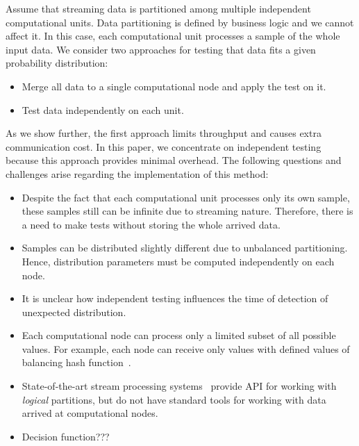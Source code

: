 \label {fs-short-model}

Assume that streaming data is partitioned among multiple independent computational units. Data partitioning is defined by business logic and we cannot affect it. In this case, each computational unit processes a sample of the whole input data. We consider two approaches for testing that data fits a given probability distribution:

\begin{itemize}
    \item Merge all data to a single computational node and apply the test on it.
    \item Test data independently on each unit.
\end{itemize}

As we show further, the first approach limits throughput and causes extra communication cost. In this paper, we concentrate on independent testing because this approach provides minimal overhead. The following questions and challenges arise regarding the implementation of this method:

\begin{itemize}
    \item Despite the fact that each computational unit processes only its own sample, these samples still can be infinite due to streaming nature. Therefore, there is a need to make tests without storing the whole arrived data.
    \item Samples can be distributed slightly different due to unbalanced partitioning. Hence, distribution parameters must be computed independently on each node.
    \item It is unclear how independent testing influences the time of detection of unexpected distribution.
    \item Each computational node can process only a limited subset of all possible values. For example, each node can receive only values with defined values of balancing hash function~\cite{carbone2015apache}.
    \item State-of-the-art stream processing systems~\cite{Carbone:2017:SMA:3137765.3137777, apache:storm, Zaharia:2012:DSE:2342763.2342773} provide API for working with {\em logical} partitions, but do not have standard tools for working with data arrived at computational nodes.
    \item Decision function???
\end{itemize}